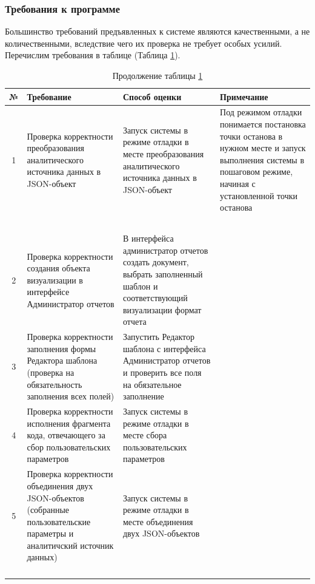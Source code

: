 \documentclass[a4paper]{extarticle}
\numberwithin{equation}{section}
\begin{document}
\subsubsection{Требования к программе}
Большинство требований предъявленных к системе являются качественными, а не количественными, вследствие чего их проверка не требует особых усилий. Перечислим требования в таблице (Таблица \ref{tableTreb}).\par
\begin{longtable}[H]{|c|p{}|p{}|p{}|}
  \caption{Требования к программе}
  \label{tableTreb}\\
  \hline
  №  & Требование & Способ оценки & Примечание \\\hline
  \endfirsthead
  1  & Проверка корректности преобразования аналитического источника данных в JSON-объект & Запуск системы в режиме отладки в месте преобразования аналитического источника данных в JSON-объект & Под режимом отладки понимается постановка точки останова в нужном месте и запуск выполнения системы в пошаговом режиме, начиная с установленной точки останова\\
    \multicolumn{4}{l}{}\\\multicolumn{4}{l}{}\\\multicolumn{4}{l}{}\\\multicolumn{4}{l}{}\\
  	\caption*{Продолжение таблицы \ref{tableTreb}} \\\hline
  2  & Проверка корректности создания объекта визуализации в интерфейсе Администратор отчетов & В интерфейса администратор отчетов создать документ, выбрать заполненный шаблон и соответствующий визуализации формат отчета & \\\hline
  3  & Проверка корректности заполнения формы Редактора шаблона (проверка на обязательность заполнения всех полей) & Запустить Редактор шаблона с интерфейса Администратор отчетов и проверить все поля на обязательное заполнение & \\\hline
  4  & Проверка корректности исполнения фрагмента кода, отвечающего за сбор пользовательских параметров & Запуск системы в режиме отладки в месте сбора пользовательских параметров & \\\hline
  5  & Проверка корректности объединения двух JSON-объектов (собранные пользовательские параметры и аналитичский источник данных) & Запуск системы в режиме отладки в месте объединения двух JSON-объектов & \\
  \multicolumn{4}{l}{}\\\multicolumn{4}{l}{}\\\multicolumn{4}{l}{}\\\multicolumn{4}{l}{}\\

\end{longtable}
\end{document}
